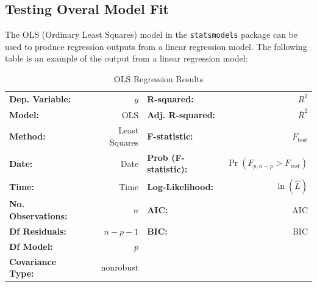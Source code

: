 \documentclass{article}
\begin{document}
\subsection{Testing Overal Model Fit}
The OLS (Ordinary Least Squares) model in the \texttt{statsmodels}
package can be used to produce regression outputs from a linear
regression model. The following table is an example of the output from
a linear regression model:
\begin{table}[H]
    \centering
    \begin{tabular}{lrlr}
        \toprule
        \textbf{Dep. Variable:}    & \(y\)         & \textbf{R-squared:}          & \(R^2\)                                                  \\
        \textbf{Model:}            & OLS           & \textbf{Adj. R-squared:}     & \(\bar{R}^2\)                                            \\
        \textbf{Method:}           & Least Squares & \textbf{F-statistic:}        & \(F_{\mathrm{test}}\)                                    \\
        \textbf{Date:}             & Date          & \textbf{Prob (F-statistic):} & \(\Pr{\left( F_{p, n - p} > F_{\mathrm{test}} \right)}\) \\
        \textbf{Time:}             & Time          & \textbf{Log-Likelihood:}     & \(\ln{\left( \hat{L} \right)}\)                          \\
        \textbf{No. Observations:} & \(n\)         & \textbf{AIC:}                & AIC                                                      \\
        \textbf{Df Residuals:}     & \(n - p - 1\) & \textbf{BIC:}                & BIC                                                      \\
        \textbf{Df Model:}         & \(p\)         &                              &                                                          \\
        \textbf{Covariance Type:}  & nonrobust     &                              &                                                          \\
        \bottomrule
    \end{tabular}
    \caption{OLS Regression Results} %
\end{table}
\end{document}
